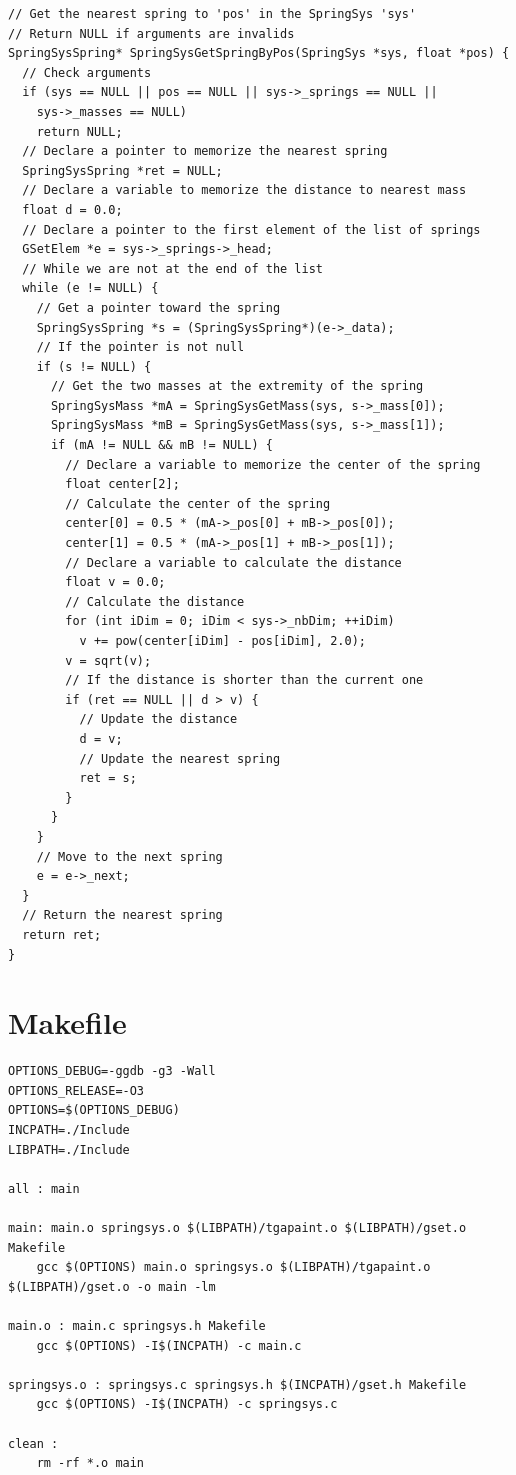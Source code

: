 \documentclass[12pt, a4paper]{article}
\begin{document}
\begin{scriptsize}
\begin{ttfamily}
\begin{lstlisting}
// Get the nearest spring to 'pos' in the SpringSys 'sys'
// Return NULL if arguments are invalids
SpringSysSpring* SpringSysGetSpringByPos(SpringSys *sys, float *pos) {
  // Check arguments
  if (sys == NULL || pos == NULL || sys->_springs == NULL || 
    sys->_masses == NULL)
    return NULL;
  // Declare a pointer to memorize the nearest spring
  SpringSysSpring *ret = NULL;
  // Declare a variable to memorize the distance to nearest mass
  float d = 0.0;
  // Declare a pointer to the first element of the list of springs
  GSetElem *e = sys->_springs->_head;
  // While we are not at the end of the list
  while (e != NULL) {
    // Get a pointer toward the spring
    SpringSysSpring *s = (SpringSysSpring*)(e->_data);
    // If the pointer is not null
    if (s != NULL) {
      // Get the two masses at the extremity of the spring
      SpringSysMass *mA = SpringSysGetMass(sys, s->_mass[0]);
      SpringSysMass *mB = SpringSysGetMass(sys, s->_mass[1]);
      if (mA != NULL && mB != NULL) {
        // Declare a variable to memorize the center of the spring
        float center[2];
        // Calculate the center of the spring
        center[0] = 0.5 * (mA->_pos[0] + mB->_pos[0]);
        center[1] = 0.5 * (mA->_pos[1] + mB->_pos[1]);
        // Declare a variable to calculate the distance
        float v = 0.0;
        // Calculate the distance
        for (int iDim = 0; iDim < sys->_nbDim; ++iDim)
          v += pow(center[iDim] - pos[iDim], 2.0);
        v = sqrt(v);
        // If the distance is shorter than the current one
        if (ret == NULL || d > v) {
          // Update the distance
          d = v;
          // Update the nearest spring
          ret = s;
        }
      }
    }
    // Move to the next spring
    e = e->_next;
  }
  // Return the nearest spring
  return ret;  
}
\end{lstlisting}
\end{ttfamily}
\end{scriptsize}

\section{Makefile}

\begin{scriptsize}
\begin{ttfamily}
\begin{lstlisting}
OPTIONS_DEBUG=-ggdb -g3 -Wall
OPTIONS_RELEASE=-O3 
OPTIONS=$(OPTIONS_DEBUG)
INCPATH=./Include
LIBPATH=./Include

all : main

main: main.o springsys.o $(LIBPATH)/tgapaint.o $(LIBPATH)/gset.o Makefile 
	gcc $(OPTIONS) main.o springsys.o $(LIBPATH)/tgapaint.o $(LIBPATH)/gset.o -o main -lm

main.o : main.c springsys.h Makefile
	gcc $(OPTIONS) -I$(INCPATH) -c main.c

springsys.o : springsys.c springsys.h $(INCPATH)/gset.h Makefile
	gcc $(OPTIONS) -I$(INCPATH) -c springsys.c

clean : 
	rm -rf *.o main
\end{lstlisting}
\end{ttfamily}
\end{scriptsize}
\end{document}
